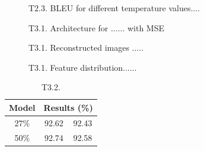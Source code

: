 \documentclass[10pt,twocolumn,letterpaper]{article}
\begin{document}
\begin{figure}[h]
\begin{center}
\fbox{\rule{0pt}{1.2in} \rule{0.99\linewidth}{0pt}}
\end{center}
   \caption{T2.3. BLEU for different temperature values....}
\label{fig:4}
\end{figure} 


\begin{figure}[h]
\begin{center}
\fbox{\rule{0pt}{1.2in} \rule{0.99\linewidth}{0pt}}
\end{center}
   \caption{T3.1. Architecture for ...... with MSE}
\label{fig:5}
\end{figure} 





\begin{figure}[h]
\begin{center}
\fbox{\rule{0pt}{1.5in} \rule{0.99\linewidth}{0pt}}
\end{center}
   \caption{T3.1. Reconstructed images .....}
\label{fig:6}
\end{figure} 




\begin{figure}[h]
\begin{center}
\fbox{\rule{0pt}{1.2in} \rule{0.99\linewidth}{0pt}}
\end{center}
   \caption{T3.1. Feature distribution......}
\label{fig:7}
\end{figure} 






\begin{table}[h]
\small
    \centering
    \begin{tabular}{c|c|c}
        Model & \multicolumn{2}{c}{ Results (\%)} \\
        \hline
        27\% & 92.62 & 92.43 \\ %
        50\% & 92.74 & 92.58 \\ %
    \end{tabular}%
    \medbreak
    \caption{T3.2.}
    \label{table:2}
\end{table}
\end{document}
